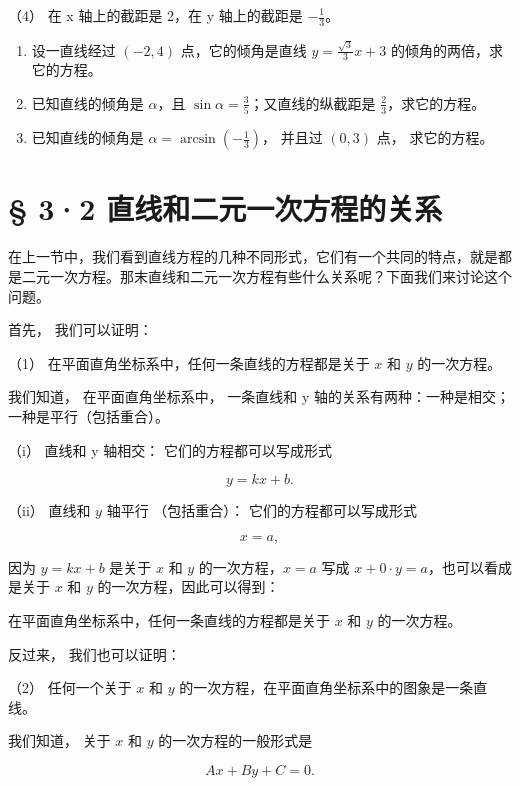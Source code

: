 （4） 在 x 轴上的截距是 2，在 y 轴上的截距是 \(-\frac{1}{3}\)。

\begin{enumerate}
\def\labelenumi{\arabic{enumi}.}
\setcounter{enumi}{4}
\item
  设一直线经过 \((-2, 4)\) 点，它的倾角是直线
  \(y = \frac{\sqrt{3}}{3} x + 3\) 的倾角的两倍，求它的方程。
\item
  已知直线的倾角是 \(\alpha\)，且
  \(\sin \alpha = \frac{3}{5}\)；又直线的纵截距是
  \(\frac{2}{3}\)，求它的方程。
\item
  已知直线的倾角是 \(\alpha = \arcsin \left(-\frac{1}{3}\right)\)，
  并且过 \((0, 3)\) 点， 求它的方程。
\end{enumerate}

\section{§ 3·2
直线和二元一次方程的关系}\label{ux76f4ux7ebfux548cux4e8cux5143ux4e00ux6b21ux65b9ux7a0bux7684ux5173ux7cfb}

在上一节中，我们看到直线方程的几种不同形式，它们有一个共同的特点，就是都是二元一次方程。那末直线和二元一次方程有些什么关系呢？下面我们来讨论这个问题。

首先， 我们可以证明：

（1） 在平面直角坐标系中，任何一条直线的方程都是关于 \(x\) 和 \(y\)
的一次方程。

我们知道， 在平面直角坐标系中， 一条直线和 y
轴的关系有两种：一种是相交；一种是平行（包括重合）。

（i） 直线和 y 轴相交： 它们的方程都可以写成形式

\[
y = k x + b.
\]

（ii） 直线和 \(y\) 轴平行 （包括重合）： 它们的方程都可以写成形式

\[
x = a,
\]

因为 \(y = kx + b\) 是关于 \(x\) 和 \(y\) 的一次方程，\(x = a\) 写成
\(x + 0 \cdot y = a\)，也可以看成是关于 \(x\) 和 \(y\)
的一次方程，因此可以得到：

在平面直角坐标系中，任何一条直线的方程都是关于 \(x\) 和 \(y\)
的一次方程。

反过来， 我们也可以证明：

（2） 任何一个关于 \(x\) 和 \(y\)
的一次方程，在平面直角坐标系中的图象是一条直线。

我们知道， 关于 \(x\) 和 \(y\) 的一次方程的一般形式是

\[
A x + B y + C = 0. \tag {1}
\]

